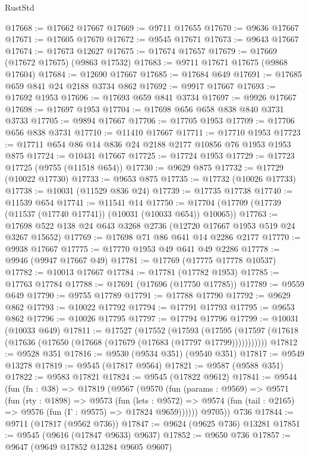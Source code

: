 \begin{lexlean}{RustStd}
\begin{coremodule}
@17668 := @17662 @17667
@17669 := @9711 @17655
@17670 := @9636 @17667
@17671 := @17605 @17670
@17672 := @9545 @17671
@17673 := @9643 @17667
@17674 := @17673 @12627
@17675 := @17674 @17657
@17679 := @17669 (@17672 @17675) (@9863 @17532)
@17683 := @9711 @17671 @17675 (@9868 @17604)
@17684 := @12690 @17667
@17685 := @17684 @649
@17691 := @17685 @659 @841 @24 @2188 @3734 @862
@17692 := @9917 @17667
@17693 := @17692 @1953
@17696 := @17693 @659 @841 @3734
@17697 := @9926 @17667
@17698 := @17697 @1953
@17704 := @17698 @656 @658 @838 @840 @3731 @3733
@17705 := @9894 @17667
@17706 := @17705 @1953
@17709 := @17706 @656 @838 @3731
@17710 := @11410 @17667
@17711 := @17710 @1953
@17723 := @17711 @654 @86 @14 @836 @24 @2188 @2177 @10856 @76 @1953 @1953 @875
@17724 := @10431 @17667
@17725 := @17724 @1953
@17729 := @17723 @17725 (@9755 (@11518 @654))
@17730 := @9629 @875
@17732 := @17729 (@10022 @17730)
@17733 := @9653 @875
@17735 := @17732 (@10026 @17733)
@17738 := @10031 (@11529 @836 @24)
@17739 := @17735 @17738
@17740 := @11539 @654
@17741 := @11541 @14
@17750 := @17704 (@17709 (@17739 (@11537 (@17740 @17741)) (@10031 (@10033 @654)) @10065))
@17763 := @17698 @522 @138 @24 @643 @3268 @2736 (@12720 @17667 @1953 @519 @24 @3267 @15652)
@17769 := @17698 @71 @86 @641 @14 @2286 @2177
@17770 := @9938 @17667
@17775 := @17770 @1953 @49 @641 @49 @2286
@17778 := @9946 (@9947 @17667 @49)
@17781 := @17769 (@17775 @17778 @10537)
@17782 := @10013 @17667
@17784 := @17781 (@17782 @1953)
@17785 := @17763 @17784
@17788 := @17691 (@17696 (@17750 @17785))
@17789 := @9559 @649
@17790 := @9755 @17789
@17791 := @17788 @17790
@17792 := @9629 @862
@17793 := @10022 @17792
@17794 := @17791 @17793
@17795 := @9653 @862
@17796 := @10026 @17795
@17797 := @17794 @17796
@17799 := @10031 (@10033 @649)
@17811 := @17527
    (@17552
      (@17593
        (@17595 (@17597 (@17618 (@17636 (@17650 (@17668 (@17679 (@17683 (@17797 @17799)))))))))))
@17812 := @9528 @351
@17816 := @9530 (@9534 @351) (@9540 @351)
@17817 := @9549 @13278
@17819 := @9545 (@17817 @9564)
@17821 := @9587 (@9588 @351)
@17822 := @9583 @17821
@17824 := @9545 (@17822 @9612)
@17841 := @9544
    (fun (fn : @38) =>
    @17819
      (@9567
        (@9570
          (fun (params : @9569) =>
          @9571
            (fun (rty : @1898) =>
            @9573
              (fun (lets : @9572) =>
              @9574 (fun (tail : @2165) => @9576 (fun (Γ : @9575) => @17824 @9659))))))
        @9705))
    @736
@17844 := @9711 (@17817 (@9562 @736))
@17847 := @9624 (@9625 @736) @13281
@17851 := @9545 (@9616 (@17847 @9633) @9637)
@17852 := @9650 @736
@17857 := @9647 (@9649 @17852 @13284 @9605 @9607)

\end{coremodule}
\end{lexlean}
